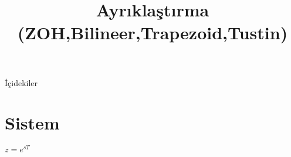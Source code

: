 
\title[Ders 1] {Ayrıklaştırma (ZOH,Bilineer,Trapezoid,Tustin)}

\frame{\titlepage}
\begin{frame}[fragile]{İçidekiler}
    \tableofcontents
\end{frame}
\section{Sistem}
\begin{frame}[fragile]{}
    $z=e^{sT}$
    \begin{equation}
        
    \end{equation}
\end{frame}
